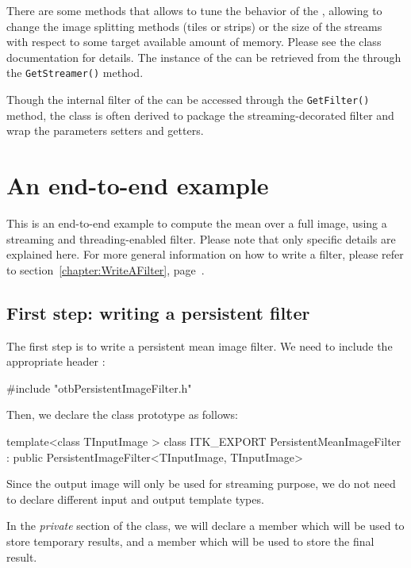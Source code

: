 There are some methods that allows to tune the behavior of the
, allowing to change the
image splitting methods (tiles or strips) or the size of the streams
with respect to some target available amount of memory. Please see the
class documentation for details. The instance of the
 can be retrieved from the
 through the
\verb?GetStreamer()? method.

Though the internal filter of the
 can be accessed
through the \verb?GetFilter()? method, the class is often derived to
package the streaming-decorated filter and wrap the parameters setters
and getters.

\section{An end-to-end example}

This is an end-to-end example to compute the mean over a full image,
using a streaming and threading-enabled filter. Please note that only
specific details are explained here. For more general information on
how to write a filter, please refer to
section~\ref{chapter:WriteAFilter}, page~\pageref{chapter:WriteAFilter}.

\subsection{First step: writing a persistent filter}

The first step is to write a persistent mean image filter. We need to
include the appropriate header :

\begin{cppcode}
#include "otbPersistentImageFilter.h"
\end{cppcode}

Then, we declare the class prototype as follows:

\begin{cppcode}
template<class TInputImage >
  class ITK_EXPORT PersistentMeanImageFilter :
    public PersistentImageFilter<TInputImage, TInputImage>
\end{cppcode}

Since the output image will only be used for streaming purpose, we do
not need to declare different input and output template types.

In the \emph{private} section of the class, we will declare a member which
will be used to store temporary results, and a member which will be
used to store the final result.


